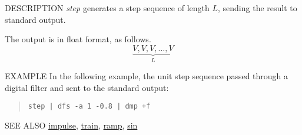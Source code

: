 \begin{synopsis}
\item[step] [ --l $L$ ] [ --n $N$ ] [ --v $V$ ]
\end{synopsis}

\begin{qsection}{DESCRIPTION}
{\em step} generates a step sequence of length $L$, 
sending the result to standard output.

The output is in float format, as follows.
\begin{displaymath}
\underbrace{V, V, V, \dots, V}_{L}
\end{displaymath}
\end{qsection}

\begin{options}
\end{options}

\begin{qsection}{EXAMPLE}
In the following example, the unit step sequence passed through
a digital filter and sent to the standard output:
\begin{quote}
\verb!step | dfs -a 1 -0.8 | dmp +f!
\end{quote}
\end{qsection}

\begin{qsection}{SEE ALSO}
\hyperlink{impulse}{impulse},
\hyperlink{train}{train},
\hyperlink{ramp}{ramp},
\hyperlink{sin}{sin}
\end{qsection}
